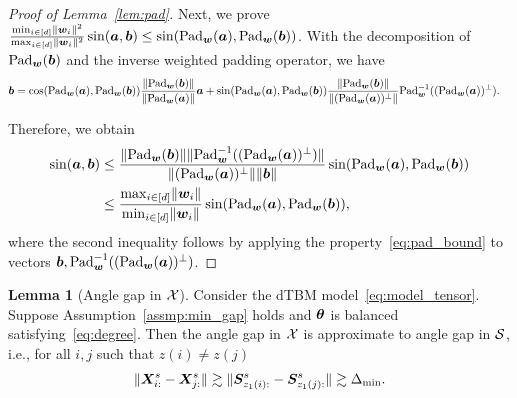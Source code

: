 \documentclass[lettersize,onecolumn,journal]{IEEEtran}
\theoremstyle{definition}
\newtheorem{lem}{Lemma}
\theoremstyle{definition}
\begin{document}
\begin{proof}[Proof of Lemma~\ref{lem:pad}]
Next, we prove $\frac{\min_{i \in [d]} \lVert\bm{w}_i\rVert^2}{\max_{i \in [d]} \lVert\bm{w}_i\rVert^2 } \sin (\bm{a}, \bm{b}) \leq \sin(\text{Pad}_{\bm{w}}(\bm{a}),  \text{Pad}_{\bm{w}}(\bm{b}))$. With the decomposition of $\text{Pad}_{\bm{w}}(\bm{b})$ and the inverse weighted padding operator, we have 
\begin{align}
    \bm{b} &=  \cos(\text{Pad}_{\bm{w}}(\bm{a}), \text{Pad}_{\bm{w}}(\bm{b})) \frac{\lVert\text{Pad}_{\bm{w}}(\bm{b})\rVert}{\lVert\text{Pad}_{\bm{w}}(\bm{a})\rVert} \bm{a} +  \sin(\text{Pad}_{\bm{w}}(\bm{a}), \text{Pad}_{\bm{w}}(\bm{b}))\frac{\lVert\text{Pad}_{\bm{w}}(\bm{b})\rVert}{\lVert(\text{Pad}_{\bm{w}}(\bm{a}))^{\perp}\rVert} \text{Pad}_{\bm{w}}^{-1}((\text{Pad}_{\bm{w}}(\bm{a}))^{\perp}).
\end{align}

Therefore, we obtain 
\begin{align}
    \sin(\bm{a}, \bm{b}) &\leq \frac{ \lVert\text{Pad}_{\bm{w}}(\bm{b}) \rVert \lVert\text{Pad}_{\bm{w}}^{-1}((\text{Pad}_{\bm{w}}(\bm{a}))^{\perp})  \rVert }{ \lVert(\text{Pad}_{\bm{w}}(\bm{a}))^{\perp} \rVert \lVert\bm{b}\rVert }  \sin(\text{Pad}_{\bm{w}}(\bm{a}), \text{Pad}_{\bm{w}}(\bm{b}))\\
    & \leq \frac{ \max_{i \in [d]} \lVert\bm{w}_i\rVert }{\min_{i \in [d]} \lVert\bm{w}_i\rVert} \sin(\text{Pad}_{\bm{w}}(\bm{a}), \text{Pad}_{\bm{w}}(\bm{b})),
\end{align}
where the second inequality follows by applying the property~\eqref{eq:pad_bound} to vectors $\bm{b}, \text{Pad}_{\bm{w}}^{-1}((\text{Pad}_{\bm{w}}(\bm{a}))^{\perp})$.
\end{proof}

\begin{lem}[Angle gap in $\mathcal{X}$]\label{lem:angle_gap_x} Consider the dTBM model~\eqref{eq:model_tensor}. Suppose Assumption~\ref{assmp:min_gap} holds and $\boldsymbol{\theta}$ is balanced satisfying~\eqref{eq:degree}. Then the angle gap in $\mathcal{X}$ is approximate to angle gap in $\mathcal{S}$, i.e., for all $i,j$ such that $z(i) \neq z(j)$
\begin{equation}
    \lVert\bm X_{i:}^s - \bm X_{j:}^s\rVert \gtrsim  \lVert\bm S_{z_1(i):}^s - \bm S_{z_1(j):}^s\rVert \gtrsim  \Delta_{\min}.
\end{equation}

\end{lem}
\end{document}
